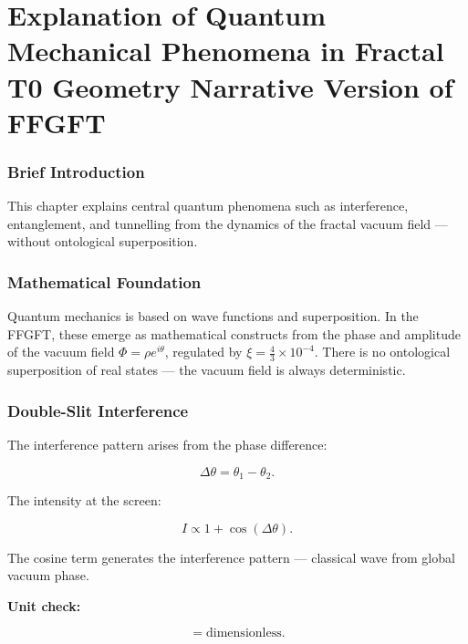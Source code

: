 \chapter{Explanation of Quantum Mechanical Phenomena in Fractal T0 Geometry  Narrative Version of FFGFT}


	
	\subsection*{Brief Introduction}
	
	This chapter explains central quantum phenomena such as interference, entanglement, and tunnelling from the dynamics of the fractal vacuum field — without ontological superposition.
	
	\subsection*{Mathematical Foundation}
	
	Quantum mechanics is based on wave functions and superposition. In the FFGFT, these emerge as mathematical constructs from the phase and amplitude of the vacuum field \(\Phi = \rho e^{i\theta}\), regulated by \(\xi = \frac{4}{3} \times 10^{-4}\). There is no ontological superposition of real states — the vacuum field is always deterministic.
	
	\subsection*{Double-Slit Interference}
	
	The interference pattern arises from the phase difference:
	
	\begin{equation}
		\Delta \theta = \theta_1 - \theta_2.
	\end{equation}
	
	The intensity at the screen:
	
	\begin{equation}
		I \propto 1 + \cos(\Delta \theta).
	\end{equation}
	
	The cosine term generates the interference pattern — classical wave from global vacuum phase.
	
	\textbf{Unit check:}
	
	\begin{equation}
		[\Delta \theta] = \text{dimensionless}.
	\end{equation}
	
